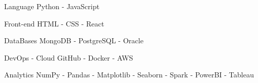 


\begin{cvskills}


\cvskill
{Language} %
{Python - JavaScript} %


\cvskill
{Front-end} %
{HTML - CSS - React} %


\cvskill
{DataBases} %
{MongoDB - PostgreSQL - Oracle} %


\cvskill
{DevOps - Cloud} %
{GitHub - Docker - AWS} %


\cvskill
{Analytics} %
{NumPy - Pandas - Matplotlib - Seaborn - Spark - PowerBI - Tableau} %




\end{cvskills}
